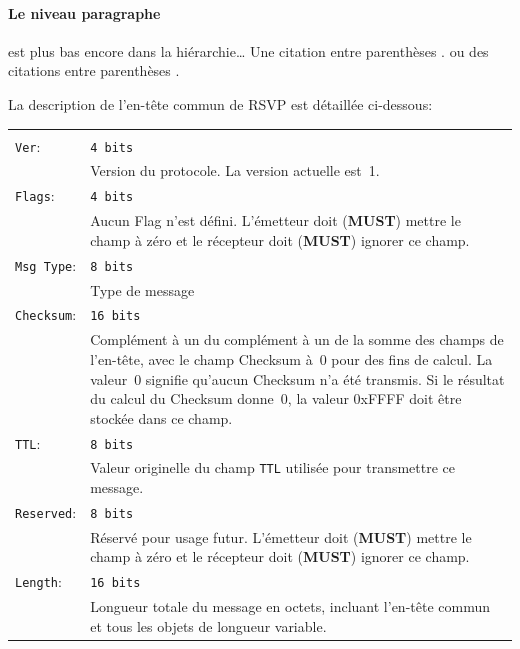 \paragraph{Le niveau paragraphe} est plus bas encore dans la hiérarchie\ldots
Une citation entre parenthèses \cite{Chen2009}.
ou des citations entre parenthèses \cite{Haist2014,Senjian2015,Madani2010}.




La description de \mbox{l'en-tête} commun de RSVP est détaillée ci-dessous:\\
\begin{tabular}{p{1in}p{4.5in}}
&\\ %
\texttt{Ver}: & \texttt{4 bits}\\
          & Version du protocole. La version actuelle est~1.\\[5pt]
\texttt{Flags}: & \texttt{4 bits}\\
          & Aucun Flag n'est défini. L'émetteur doit (\textbf{MUST})
          mettre le champ à zéro et le récepteur doit (\textbf{MUST})
          ignorer ce champ.\\[5pt]
\texttt{Msg Type}: & \texttt{8 bits}\\
          & Type de message\\[5pt]
\texttt{Checksum}: & \texttt{16 bits}\\
          & Complément à un du complément à un de la somme des champs
          de \mbox{l'en-tête}, avec le champ Checksum à~0 pour des
          fins de calcul. La valeur~0 signifie qu'aucun Checksum n'a
          été transmis. Si le résultat du calcul du Checksum donne~0,
          la valeur 0xFFFF doit être stockée dans ce champ.\\[5pt]
\texttt{TTL}: & \texttt{8 bits}\\
          & Valeur originelle du champ \texttt{TTL} utilisée pour
          transmettre ce message.\\[5pt]
\texttt{Reserved}: & \texttt{8 bits}\\
          & Réservé pour usage futur. L'émetteur doit (\textbf{MUST})
          mettre le champ à zéro et le récepteur doit (\textbf{MUST})
          ignorer ce champ.\\[5pt]
\texttt{Length}: & \texttt{16 bits}\\
          & Longueur totale du message en octets, incluant
          \mbox{l'en-tête} commun et tous les objets de longueur
          variable.
\end{tabular}

